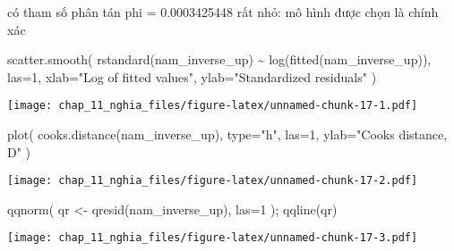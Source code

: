 \documentclass[
]{article}
\newenvironment{Shaded}{\begin{snugshade}}{\end{snugshade}}
\newcommand{\AttributeTok}[1]{\textcolor[rgb]{0.77,0.63,0.00}{#1}}
\newcommand{\DecValTok}[1]{\textcolor[rgb]{0.00,0.00,0.81}{#1}}
\newcommand{\FunctionTok}[1]{\textcolor[rgb]{0.00,0.00,0.00}{#1}}
\newcommand{\NormalTok}[1]{#1}
\newcommand{\OtherTok}[1]{\textcolor[rgb]{0.56,0.35,0.01}{#1}}
\newcommand{\SpecialCharTok}[1]{\textcolor[rgb]{0.00,0.00,0.00}{#1}}
\newcommand{\StringTok}[1]{\textcolor[rgb]{0.31,0.60,0.02}{#1}}
\begin{document}
có tham số phân tán phi = 0.0003425448 rất nhỏ: mô hình được chọn là
chính xác

\begin{Shaded}
\begin{Highlighting}[]
\FunctionTok{scatter.smooth}\NormalTok{( }\FunctionTok{rstandard}\NormalTok{(nam\_inverse\_up) }\SpecialCharTok{\textasciitilde{}} \FunctionTok{log}\NormalTok{(}\FunctionTok{fitted}\NormalTok{(nam\_inverse\_up)), }\AttributeTok{las=}\DecValTok{1}\NormalTok{,}
\AttributeTok{xlab=}\StringTok{"Log of fitted values"}\NormalTok{, }\AttributeTok{ylab=}\StringTok{"Standardized residuals"}\NormalTok{ )}
\end{Highlighting}
\end{Shaded}

\texttt{[image: chap\_11\_nghia\_files/figure-latex/unnamed-chunk-17-1.pdf]}

\begin{Shaded}
\begin{Highlighting}[]
\FunctionTok{plot}\NormalTok{( }\FunctionTok{cooks.distance}\NormalTok{(nam\_inverse\_up), }\AttributeTok{type=}\StringTok{"h"}\NormalTok{, }\AttributeTok{las=}\DecValTok{1}\NormalTok{,}
\AttributeTok{ylab=}\StringTok{"Cook\textquotesingle{}s distance, D"}\NormalTok{ )}
\end{Highlighting}
\end{Shaded}

\texttt{[image: chap\_11\_nghia\_files/figure-latex/unnamed-chunk-17-2.pdf]}

\begin{Shaded}
\begin{Highlighting}[]
\FunctionTok{qqnorm}\NormalTok{( qr }\OtherTok{\textless{}{-}} \FunctionTok{qresid}\NormalTok{(nam\_inverse\_up), }\AttributeTok{las=}\DecValTok{1}\NormalTok{ ); }\FunctionTok{qqline}\NormalTok{(qr)}
\end{Highlighting}
\end{Shaded}

\texttt{[image: chap\_11\_nghia\_files/figure-latex/unnamed-chunk-17-3.pdf]}

\begin{Shaded}
\end{Shaded}
\end{document}
